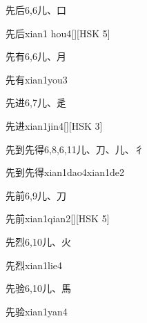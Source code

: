 \begin{Entry}{先后}{6,6}{⼉、⼝}
  \begin{Phonetics}{先后}{xian1 hou4}[][HSK 5]
  \end{Phonetics}
\end{Entry}

\begin{Entry}{先有}{6,6}{⼉、⽉}
  \begin{Phonetics}{先有}{xian1you3}
  \end{Phonetics}
\end{Entry}

\begin{Entry}{先进}{6,7}{⼉、⾡}
  \begin{Phonetics}{先进}{xian1jin4}[][HSK 3]
  \end{Phonetics}
\end{Entry}

\begin{Entry}{先到先得}{6,8,6,11}{⼉、⼑、⼉、⼻}
  \begin{Phonetics}{先到先得}{xian1dao4xian1de2}
  \end{Phonetics}
\end{Entry}

\begin{Entry}{先前}{6,9}{⼉、⼑}
  \begin{Phonetics}{先前}{xian1qian2}[][HSK 5]
  \end{Phonetics}
\end{Entry}

\begin{Entry}{先烈}{6,10}{⼉、⽕}
  \begin{Phonetics}{先烈}{xian1lie4}
  \end{Phonetics}
\end{Entry}

\begin{Entry}{先验}{6,10}{⼉、⾺}
  \begin{Phonetics}{先验}{xian1yan4}
  \end{Phonetics}
\end{Entry}

